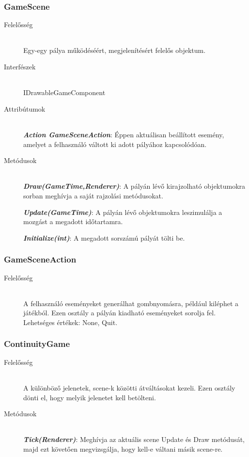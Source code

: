 \subsubsection{GameScene}
	\begin{description}
		\item[Felelősség] \hfill \\
		Egy-egy pálya működéséért, megjelenítésért felelős objektum.
		\item[Interfészek]\hfill \\
		IDrawableGameComponent
		\item[Attribútumok]\hfill \\
		\textbf{\emph{Action GameSceneAction}}: Éppen aktuálisan beállított esemény, amelyet a felhasználó váltott ki adott pályához kapcsolódóan.

		\item[Metódusok]\hfill \\
		\textbf{\emph{Draw(GameTime,Renderer)}}: A pályán lévő kirajzolható objektumokra sorban meghívja a saját rajzolási metódusokat.

		\textbf{\emph{Update(GameTime)}}: A pályán lévő objektumokra leszimulálja a mozgást a megadott időtartamra.
		
		\textbf{\emph{Initialize(int)}}: A megadott sorszámú pályát tölti be.
	\end{description}
	
\subsubsection{GameSceneAction}
	\begin{description}
		\item[Felelősség] \hfill \\
		A felhasználó eseményeket generálhat gombnyomásra, például kiléphet a játékból. Ezen osztály a pályán kiadható eseményeket sorolja fel. Lehetséges értékek: None, Quit.
	\end{description}
	
\subsubsection{ContinuityGame}
	\begin{description}
		\item[Felelősség] \hfill \\
		A különböző jelenetek, scene-k közötti átváltásokat kezeli. Ezen osztály dönti el, hogy melyik jelenetet kell betölteni.
		\item[Metódusok]\hfill \\
		\textbf{\emph{Tick(Renderer)}}: Meghívja az aktuális scene Update és Draw metódusát, majd ezt követően megvizsgálja, hogy kell-e váltani másik scene-re.
	\end{description}
	
